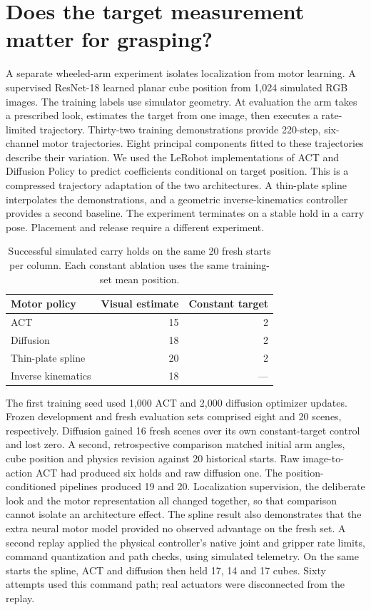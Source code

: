 \documentclass[conference]{IEEEtran}
\begin{document}
\section{Does the target measurement matter for grasping?}
A separate wheeled-arm experiment isolates localization from motor learning. A supervised ResNet-18 learned planar cube position from 1,024 simulated RGB images. The training labels use simulator geometry. At evaluation the arm takes a prescribed look, estimates the target from one image, then executes a rate-limited trajectory. Thirty-two training demonstrations provide 220-step, six-channel motor trajectories. Eight principal components fitted to these trajectories describe their variation. We used the LeRobot implementations of ACT \cite{act} and Diffusion Policy \cite{diffusion} to predict coefficients conditional on target position. This is a compressed trajectory adaptation of the two architectures. A thin-plate spline interpolates the demonstrations, and a geometric inverse-kinematics controller provides a second baseline. The experiment terminates on a stable hold in a carry pose. Placement and release require a different experiment.

\begin{table}[t]
\centering\caption{Successful simulated carry holds on the same 20 fresh starts per column. Each constant ablation uses the same training-set mean position.}
\begin{tabular}{lrr}\hline
Motor policy & Visual estimate & Constant target \\\hline
ACT & 15 & 2 \\
Diffusion & 18 & 2 \\
Thin-plate spline & 20 & 2 \\
Inverse kinematics & 18 & --- \\\hline
\end{tabular}
\end{table}

The first training seed used 1,000 ACT and 2,000 diffusion optimizer updates. Frozen development and fresh evaluation sets comprised eight and 20 scenes, respectively. Diffusion gained 16 fresh scenes over its own constant-target control and lost zero. A second, retrospective comparison matched initial arm angles, cube position and physics revision against 20 historical starts. Raw image-to-action ACT had produced six holds and raw diffusion one. The position-conditioned pipelines produced 19 and 20. Localization supervision, the deliberate look and the motor representation all changed together, so that comparison cannot isolate an architecture effect. The spline result also demonstrates that the extra neural motor model provided no observed advantage on the fresh set. A second replay applied the physical controller's native joint and gripper rate limits, command quantization and path checks, using simulated telemetry. On the same starts the spline, ACT and diffusion then held 17, 14 and 17 cubes. Sixty attempts used this command path; real actuators were disconnected from the replay.
\end{document}
